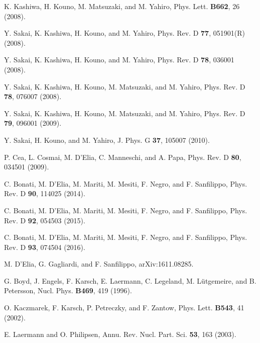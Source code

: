\documentclass[prd,superscriptaddress,unsortedaddress,
twocolumn,showpacs,preprintnumbers,amsmath,amssymb]{revtex4}
\begin{document}
\begin{thebibliography}{99}
         K. Kashiwa, H. Kouno, M. Matsuzaki, and M. Yahiro,
         Phys. Lett. \textbf{B662}, 26 (2008).

         Y. Sakai, K. Kashiwa, H. Kouno, and M. Yahiro,
         Phys. Rev. D \textbf{77}, 051901(R) (2008).

         Y. Sakai, K. Kashiwa, H. Kouno, and M. Yahiro,
         Phys. Rev. D \textbf{78}, 036001 (2008).
        
         Y. Sakai, K. Kashiwa, H. Kouno, M. Matsuzaki, and M. Yahiro,
         Phys. Rev. D \textbf{78}, 076007 (2008).

         Y. Sakai, K. Kashiwa, H. Kouno, M. Matsuzaki, and M. Yahiro,
         Phys. Rev. D \textbf{79}, 096001 (2009).

         Y. Sakai, H. Kouno, and M. Yahiro,
         J. Phys. G \textbf{37}, 105007 (2010).

         P. Cea, L. Cosmai, M. D'Elia, C. Manneschi,
         and A. Papa,
         Phys. Rev. D \textbf{80}, 034501 (2009).

         C. Bonati, M. D'Elia, M. Mariti, M. Mesiti, F. Negro,
         and F. Sanfilippo,
         Phys. Rev. D \textbf{90}, 114025 (2014).

         C. Bonati, M. D'Elia, M. Mariti, M. Mesiti,
         F. Negro, and F. Sanfilippo,
         Phys. Rev. D \textbf{92}, 054503 (2015).

         C. Bonati, M. D'Elia, M. Mariti, M. Mesiti, F. Negro,
         and F. Sanfilippo,
         Phys. Rev. D \textbf{93}, 074504 (2016).

         M. D'Elia, G. Gagliardi, and F. Sanfilippo,
         arXiv:1611.08285.

         G. Boyd, J. Engels, F. Karsch, E. Laermann, C. Legeland,
         M. L\"{u}tgemeire, and B. Petersson,
         Nucl. Phys. \textbf{B469}, 419 (1996).

         O. Kaczmarek, F. Karsch, P. Petreczky, and F. Zantow,
         Phys. Lett. \textbf{B543}, 41 (2002).

         E. Laermann and O. Philipsen,
         Annu. Rev. Nucl. Part. Sci. \textbf{53}, 163 (2003).


\end{thebibliography}
\end{document}
